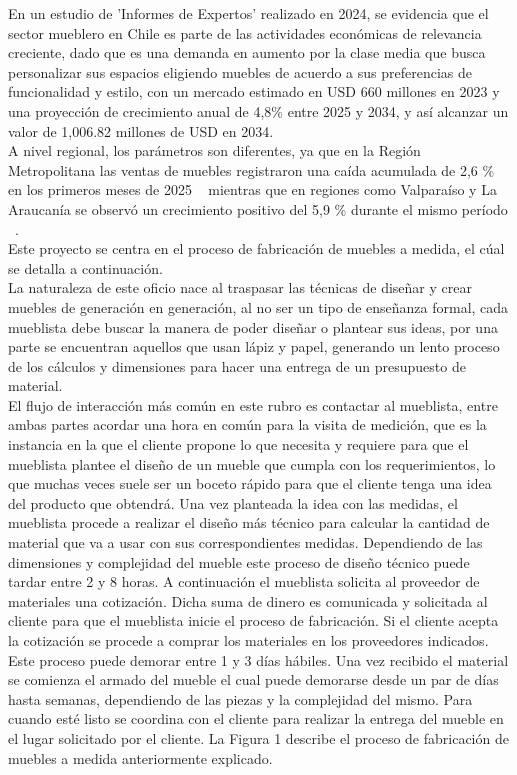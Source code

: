 ﻿\documentclass{iccmemoria}
\begin{document}
\noindent En un estudio de 'Informes de Expertos' realizado en 2024, se evidencia que el sector mueblero en Chile es parte de las actividades económicas de relevancia creciente, dado que es una demanda en aumento por la clase media que busca personalizar sus espacios eligiendo muebles de acuerdo a sus preferencias de funcionalidad y estilo, con un mercado estimado en USD 660 millones en 2023 y una proyección de crecimiento anual de 4,8\% entre 2025 y 2034, y así alcanzar un valor de 1,006.82 millones de USD en 2034.~\cite{Informes_Expertos} \\

\noindent A nivel regional, los parámetros son diferentes, ya que en la Región Metropolitana las ventas de muebles registraron una caída acumulada de 2,6 \% en los primeros meses de 2025 ~\cite{ventas_region} mientras que en regiones como Valparaíso y La Araucanía se observó un crecimiento positivo del 5,9 \% durante el mismo período ~\cite{ventas_valpo}.\\

\noindent Este proyecto se centra en el proceso de fabricación de muebles a medida, el cúal se detalla a continuación.\\

\noindent La naturaleza de este oficio nace al traspasar las técnicas de diseñar y crear muebles de generación en generación, al no ser un tipo de enseñanza formal, cada mueblista debe buscar la manera de poder diseñar o plantear sus ideas, por una parte se encuentran aquellos que usan lápiz y papel, generando un lento proceso de los cálculos y dimensiones para hacer una entrega de un presupuesto de material.\\

\noindent El flujo de interacción más común en este rubro es contactar al mueblista, entre ambas partes acordar una hora en común para la visita de medición, que es la instancia en la que el cliente propone lo que necesita y requiere para que el mueblista plantee el diseño de un mueble que cumpla con los requerimientos, lo que muchas veces suele ser un boceto rápido para que el cliente tenga una idea del producto que obtendrá. Una vez planteada la idea con las medidas, el mueblista procede a realizar el diseño más técnico para calcular la cantidad de material que va a usar con sus correspondientes medidas. Dependiendo de las dimensiones y complejidad del mueble este proceso de diseño técnico puede tardar entre 2 y 8 horas. A continuación el mueblista solicita al proveedor de materiales una cotización. Dicha suma de dinero es comunicada y solicitada al cliente para que el mueblista inicie el proceso de fabricación. Si el cliente acepta la cotización se procede a comprar los materiales en los proveedores indicados. Este proceso puede demorar entre 1 y 3 días hábiles. Una vez recibido el material se comienza el armado del mueble el cual puede demorarse desde un par de días hasta semanas, dependiendo de las piezas y la complejidad del mismo. Para cuando esté listo se coordina con el cliente para realizar la entrega del mueble en el lugar solicitado por el cliente. La Figura 1 describe el proceso de fabricación de muebles a medida anteriormente explicado.\\
\end{document}
